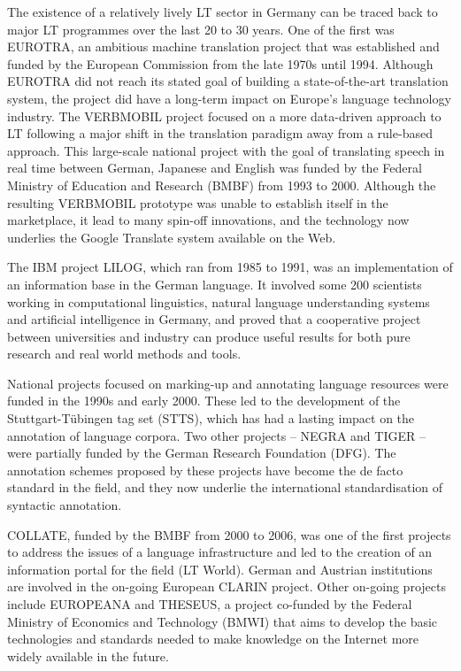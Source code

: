 \documentclass[]{../../metanetpaper}
\begin{document}
\begin{multicols}{2}
The existence of a relatively lively LT sector in Germany can be traced back to major LT programmes over the last 20 to 30 years. One of the first was EUROTRA, an ambitious machine translation project that was established and funded by the European Commission from the late 1970s until 1994. Although EUROTRA did not  reach its stated goal of building a state-of-the-art translation system, the project did have a long-term impact on Europe’s language technology industry. The VERBMOBIL project focused on a more data-driven approach to LT following a major shift in the translation paradigm away from a rule-based approach. This large-scale national project with the goal of translating speech in real time between German, Japanese and English was funded by the Federal Ministry of Education and Research (BMBF) from 1993 to 2000. Although the resulting VERBMOBIL prototype was unable to establish itself in the marketplace, it lead to many spin-off innovations, and the technology now underlies the Google Translate system available on the Web. 

    The IBM project LILOG, which ran from 1985 to 1991, was an implementation of an information base in the German language. It involved some 200 scientists working in computational linguistics, natural language understanding systems and artificial intelligence in Germany, and proved that a cooperative project between universities and industry can produce useful results for both pure research and real world methods and tools.

    National projects focused on marking-up and annotating language resources were funded in the 1990s and early 2000. These led to the development of the Stuttgart-Tübingen tag set (STTS), which has had a lasting impact on the annotation of language corpora. Two other projects – NEGRA and TIGER – were partially funded by the German Research Foundation (DFG). The annotation schemes proposed by these projects have become the de facto standard in the field, and they now underlie the international standardisation of syntactic annotation.

    COLLATE, funded by the BMBF from 2000 to 2006, was one of the first projects to address the issues of a language infrastructure and led to the creation of an information portal for the field (LT World). German and Austrian institutions are involved in the on-going European CLARIN project. Other on-going projects include EUROPEANA and THESEUS, a project co-funded by the Federal Ministry of Economics and Technology (BMWI) that aims to develop the basic technologies and standards needed to make knowledge on the Internet more widely available in the future. 


\end{multicols}
\end{document}
